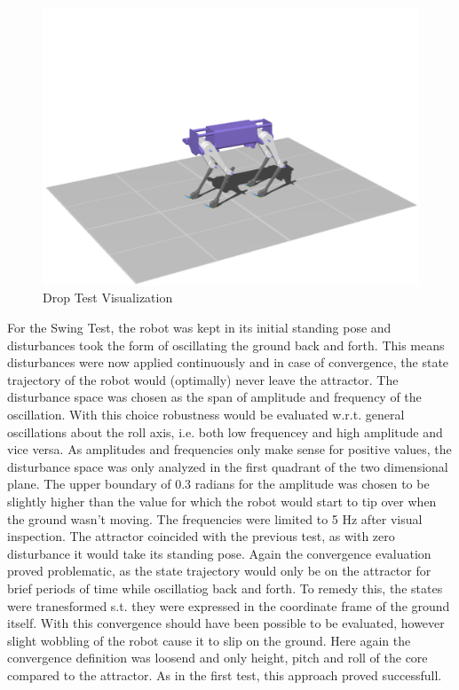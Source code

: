 \begin{figure}[h!]
\begin{minipage}{0.32\textwidth}
            \centering
            \includegraphics[width=\textwidth]{figures/lkgdrop_3_crop.png} %
        \end{minipage}
        

    \caption{Drop Test Visualization}
    \label{fig:droplkg}

\end{figure}

    For the Swing Test, the robot was kept in its initial standing pose and disturbances took the form of oscillating the ground back and forth. This means disturbances were now applied continuously and in case of convergence, the state trajectory of the robot would (optimally) never leave the attractor. The disturbance space was chosen as the span of amplitude and frequency of the oscillation. With this choice robustness would be evaluated w.r.t. general oscillations about the roll axis, i.e. both low frequencey and high amplitude and vice versa. As amplitudes and frequencies only make sense for positive values, the disturbance space was only analyzed in the first quadrant of the two dimensional plane. The upper boundary of $0.3$ radians for the amplitude was chosen to be slightly higher than the value for which the robot would start to tip over when the ground wasn't moving. The frequencies were limited to 5 Hz after visual inspection. 
    The attractor coincided with the previous test, as with zero disturbance it would take its standing pose. 
    Again the convergence evaluation proved problematic, as the state trajectory would only be on the attractor for brief periods of time while oscillatiog back and forth. To remedy this, the states were tranesformed s.t. they were expressed in the coordinate frame of the ground itself. With this convergence should have been possible to be evaluated, however slight wobbling of the robot cause it to slip on the ground. Here again the convergence definition was loosend and only height, pitch and roll of the core compared to the attractor. As in the first test, this approach proved successfull. 

